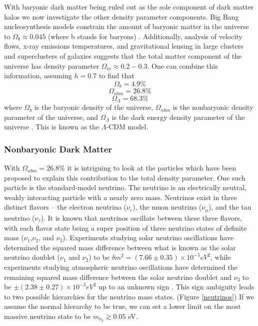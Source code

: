 \documentclass[a4paper,12pt]{article}
\begin{document}
With baryonic dark matter being ruled out as the sole component of dark matter halos we now investigate the other density parameter components. Big Bang nucleosynthesis models constrain the amount of baryonic matter in the universe to $\Omega_b \approx 0.045$ (where b stands for baryons) \cite{Tytler}.  Additionally, analysis of velocity flows, x-ray emissions temperatures, and gravitational lensing in large clusters and superclusters of galaxies suggests that the total matter component of the universe has density parameter $\Omega_m \approx 0.2-0.3$.  One can combine this information, assuming $h=0.7$ to find that
\[\Omega_b = 4.9\% \]
\[\Omega_{nbm} = 26.8\% \]
\[\Omega_\Lambda = 68.3\%\]
where $\Omega_b$ is the baryonic density of the universe, $\Omega_{nbm}$ is the nonbaryonic density parameter of the universe, and $\Omega_\Lambda$ is the dark energy density parameter of the universe \cite{Spergel,Planck}. This is known as the $\Lambda$-CDM model. 

\subsubsection{Nonbaryonic Dark Matter}

With $\Omega_{nbm} = 26.8\% $ it is intriguing to look at the particles which have been proposed to explain this contribution to the total density parameter. One such particle is the standard-model neutrino.  The neutrino is an electrically neutral, weakly interacting particle with a nearly zero mass.  Neutrinos exist in three distinct flavors -- the electron neutrino ($\nu_e$), the muon neutrino ($\nu_\mu$), and the tau neutrino ($\nu_\tau$).  It is known that neutrinos oscillate between these three flavors, with each flavor state being a super position of three neutrino states of definite mass ($\nu_1$,$\nu_2$, and $\nu_3$).  Experiments studying solar neutrino oscillations have determined the squared mass difference between what is known as the solar neutrino doublet ($\nu_1$ and $\nu_2$) to be $\delta m^2 = (7.66 \pm 0.35) \times 10^{-5} eV^2$, while experiments studying atmospheric neutrino oscillations have determined the remaining squared mass difference between the solar neutrino doublet and $\nu_3$ to be $\pm (2.38 \pm 0.27) \times 10^{-3} eV^2$ up to an unknown sign \cite{Robertson}.  This sign ambiguity leads to two possible hierarchies for the neutrino mass states. (Figure \ref{neutrinos})  If we assume the normal hierarchy to be true, we can set a lower limit on the most massive neutrino state to be $ m_{\nu_3} \gtrsim 0.05$ eV.
\end{document}
